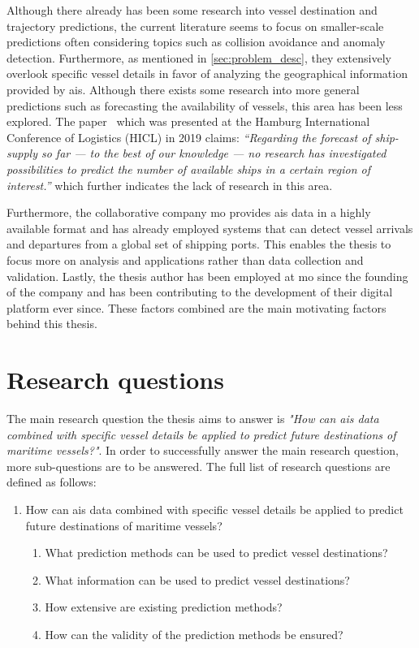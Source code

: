 Although there already has been some research into vessel destination and trajectory predictions, the current literature seems to focus on smaller-scale predictions often considering topics such as collision avoidance and anomaly detection. Furthermore, as mentioned in \cref{sec:problem_desc}, they extensively overlook specific vessel details in favor of analyzing the geographical information provided by \acrshort{ais}. Although there exists some research into more general predictions such as forecasting the availability of vessels, this area has been less explored. The paper~\cite{lechtenberg2019} which was presented at the Hamburg International Conference of Logistics (HICL) in 2019 claims: \textit{“Regarding the forecast of ship-supply so far --- to the best of our knowledge --- no research has investigated possibilities to predict the number of available ships in a certain region of interest.”} which further indicates the lack of research in this area.

Furthermore, the collaborative company \acrfull{mo} provides \acrshort{ais} data in a highly available format and has already employed systems that can detect vessel arrivals and departures from a global set of shipping ports. This enables the thesis to focus more on analysis and applications rather than data collection and validation. Lastly, the thesis author has been employed at \acrshort{mo} since the founding of the company and has been contributing to the development of their digital platform ever since. These factors combined are the main motivating factors behind this thesis.

\section{Research questions}
\label{sec:research_questions}

The main research question the thesis aims to answer is \textit{"How can \acrshort{ais} data combined with specific vessel details be applied to predict future destinations of maritime vessels?"}. In order to successfully answer the main research question, more sub-questions are to be answered. The full list of research questions are defined as follows:

\begin{enumerate}
    \item How can \acrshort{ais} data combined with specific vessel details be applied to predict future destinations of maritime vessels?
    \begin{enumerate}
    \item What prediction methods can be used to predict vessel destinations?
    \item What information can be used to predict vessel destinations?
    \item How extensive are existing prediction methods?
    \item How can the validity of the prediction methods be ensured?
    \end{enumerate}
\end{enumerate}

